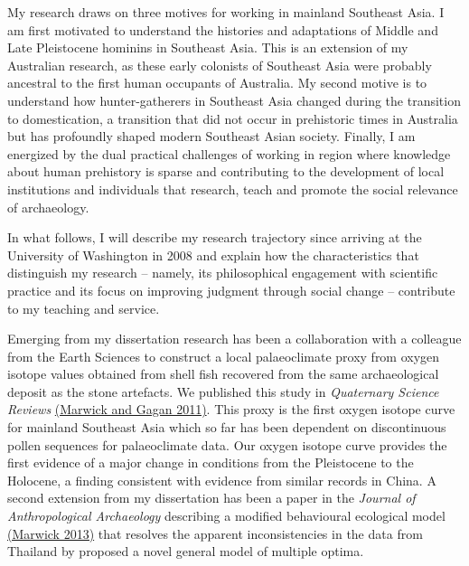\documentclass[11pt,article,oneside]{memoir}
\begin{document}
My research draws on three motives for working in mainland Southeast Asia. I am first motivated to understand the histories and adaptations of Middle and Late Pleistocene hominins in Southeast Asia. This is an extension of my Australian research, as these early colonists of Southeast Asia  were probably ancestral to the first human occupants of Australia. My second motive is to understand how hunter-gatherers in Southeast Asia changed during the transition to domestication, a transition that did not occur in prehistoric times in Australia but has profoundly shaped modern Southeast Asian society. Finally, I am energized by the dual practical challenges of working in region where knowledge about human prehistory is sparse and contributing to the development of local institutions and individuals that research, teach and promote the social relevance of archaeology. 

In what follows, I will describe my research trajectory since arriving at the University of Washington in 2008 and explain how the characteristics that distinguish my research – namely, its philosophical engagement with scientific practice and its focus on improving judgment through social change – contribute to my teaching and service.

\bigskip     


Emerging from my dissertation research has been a collaboration with a colleague from the Earth Sciences to construct a local palaeoclimate proxy from oxygen isotope values obtained from shell fish recovered from the same archaeological deposit as the stone artefacts. We published this study in \textit{Quaternary Science Reviews}  {\href{http://faculty.washington.edu/bmarwick/PDFs/Marwick_and_Gagan_2011_QSR.pdf}{(Marwick and Gagan 2011)}}. This proxy is the first oxygen isotope curve for mainland Southeast Asia which so far has been dependent on discontinuous pollen sequences for palaeoclimate data. Our oxygen isotope curve provides the first evidence of a major change in conditions from the Pleistocene to the Holocene, a finding consistent with evidence from similar records in China. A second extension from my dissertation has been a paper in the \textit{Journal of Anthropological Archaeology} describing a modified behavioural ecological model {\href{http://www.academia.edu/4845513/Multiple_Optima_in_Hoabinhian_flaked_stone_artefact_palaeoeconomics_and_palaeoecology_at_two_archaeological_sites_in_Northwest_Thailand}{(Marwick 2013)}} that resolves the apparent inconsistencies in the data from Thailand by proposed a novel general model of multiple optima. 
\end{document}
